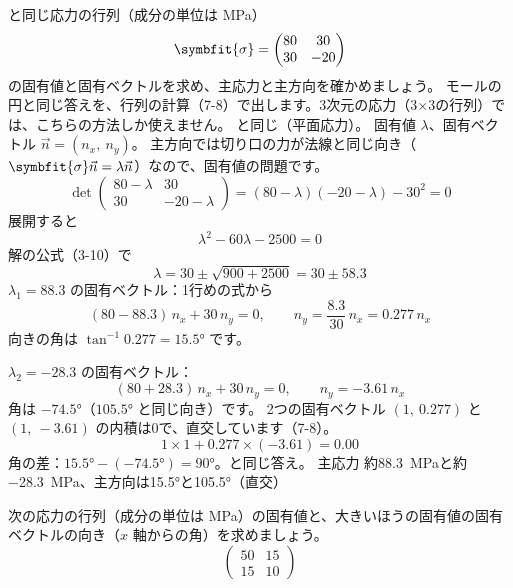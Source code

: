 \begin{phreidai}[主応力を固有値として求める]
\label{ph:力-9:ex4}と同じ応力の行列（成分の単位は MPa）
\[\symbfit{\sigma}=\begin{pmatrix}80&30\\30&-20\end{pmatrix}\]
の固有値と固有ベクトルを求め、主応力と主方向を確かめましょう。
\phbamen
モールの円と同じ答えを、行列の計算（7-8）で出します。3次元の応力（3×3の行列）では、こちらの方法しか使えません。
\phmushi
{}と同じ（平面応力）。
\phzu
固有値 $\lambda$、固有ベクトル $\vec n=(n_x,\ n_y)$。
\phriyu
主方向では切り口の力が法線と同じ向き（$\symbfit{\sigma}\vec n=\lambda\vec n$）なので、固有値の問題です。
\phtateru
\[\det\begin{pmatrix}80-\lambda&30\\30&-20-\lambda\end{pmatrix}=(80-\lambda)(-20-\lambda)-30^2=0\]
\phtoku
展開すると
\[\lambda^2-60\lambda-2500=0\]
解の公式（3-10）で
\[\lambda=30\pm\sqrt{900+2500}=30\pm58.3\]
$\lambda_1=88.3$ の固有ベクトル：1行めの式から
\[(80-88.3)\,n_x+30\,n_y=0,\qquad n_y=\frac{8.3}{30}\,n_x=0.277\,n_x\]
向きの角は $\tan^{-1}0.277=15.5°$ です。\par
$\lambda_2=-28.3$ の固有ベクトル：
\[(80+28.3)\,n_x+30\,n_y=0,\qquad n_y=-3.61\,n_x\]
角は $-74.5°$（$105.5°$ と同じ向き）です。
\phtashikame
2つの固有ベクトル $(1,\ 0.277)$ と $(1,\ -3.61)$ の内積は0で、直交しています（7-8）。
\[1\times1+0.277\times(-3.61)=0.00\]
角の差：$15.5°-(-74.5°)=90°$。と同じ答え。
\kotae 主応力 約\qty{88.3}{MPa}と約\qty{-28.3}{MPa}、主方向は15.5°と105.5°（直交）
\end{phreidai}
\begin{jibun}
次の応力の行列（成分の単位は MPa）の固有値と、大きいほうの固有値の固有ベクトルの向き（$x$ 軸からの角）を求めましょう。
\[\begin{pmatrix}50&15\\15&10\end{pmatrix}\]
\end{jibun}

